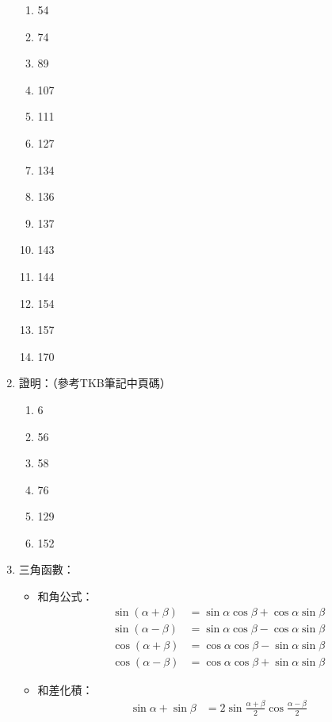 \begin{enumerate}
\begin{enumerate}
        \item 54
        \item 74
        \item 89
        \item 107
        \item 111
        \item 127
        \item 134
        \item 136
        \item 137
        \item 143
        \item 144
        \item 154
        \item 157
        \item 170
    \end{enumerate}
    \item 證明：（參考TKB筆記\cite{4}中頁碼）
    \begin{enumerate}
        \item 6
        \item 56
        \item 58
        \item 76
        \item 129
        \item 152
    \end{enumerate}
    \item 三角函數：
    \begin{itemize}
        \item 和角公式： \begin{subequations}
                \begin{align}
                    \sin(\alpha + \beta) & = \sin\alpha\cos\beta + \cos\alpha\sin\beta \\
                    \sin(\alpha - \beta) & = \sin\alpha\cos\beta - \cos\alpha\sin\beta \\
                    \cos(\alpha + \beta) & = \cos\alpha\cos\beta - \sin\alpha\sin\beta \\
                    \cos(\alpha - \beta) & = \cos\alpha\cos\beta + \sin\alpha\sin\beta
                \end{align}
            \end{subequations}
        \item 和差化積： \begin{subequations}
            \begin{align}
                \sin\alpha + \sin\beta & = 2\sin\frac{\alpha + \beta}{2}\cos\frac{\alpha - \beta}{2} \\

\end{align}
\end{subequations}
\end{itemize}
\end{enumerate}
